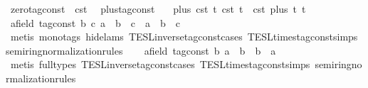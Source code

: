 \begin{isabellebody}
\isanewline
{}\isamarkupfalse%
\ {\isacartoucheopen}zero{\isacharunderscore}tag{\isacharunderscore}const\ {\isasymequiv}\ {\isasymtau}\isactrlsub c\isactrlsub s\isactrlsub t\ {}{\isacartoucheclose}\isanewline
\isanewline
{}\isamarkupfalse%
\ plus{\isacharunderscore}tag{\isacharunderscore}const\isanewline
\ \ \ {\isacartoucheopen}plus\ {\isacharparenleft}{\isasymtau}\isactrlsub c\isactrlsub s\isactrlsub t\ t\ {\isacharparenleft}{\isasymtau}\isactrlsub c\isactrlsub s\isactrlsub t\ t\ {\isacharequal}\ {\isasymtau}\isactrlsub c\isactrlsub s\isactrlsub t\ {\isacharparenleft}plus\ t\ t\isanewline
\isanewline
{}\isamarkupfalse%
%
\isadelimproof
\ %
\endisadelimproof
%
\isatagproof
{}\isamarkupfalse%
\isanewline
\ \ \isamarkupfalse%
\ {\isacartoucheopen}{\isasymAnd}{\isacharparenleft}a{\isacharcolon}{\isacharcolon}{\isacharparenleft}{\isacharprime}{\isasymtau}{\isacharcolon}{\isacharcolon}field\ tag{\isacharunderscore}const{\isacharparenright}{\isacharparenright}\ b\ c{\isachardot}\ a\ {\isacharasterisk}\ b\ {\isacharasterisk}\ c\ {\isacharequal}\ a\ {\isacharasterisk}\ {\isacharparenleft}b\ {\isacharasterisk}\ c{\isacharparenright}{\isacartoucheclose}\ \isanewline
\ \ \ \ \isamarkupfalse%
\ {\isacharparenleft}metis\ {\isacharparenleft}mono{\isacharunderscore}tags{\isacharcomma}\ hide{\isacharunderscore}lams{\isacharparenright}\ TESL{\isachardot}inverse{\isacharunderscore}tag{\isacharunderscore}const{\isachardot}cases\ TESL{\isachardot}times{\isacharunderscore}tag{\isacharunderscore}const{\isachardot}simps\ semiring{\isacharunderscore}normalization{\isacharunderscore}rules{\isacharparenleft}{}{}{\isacharparenright}{\isacharparenright}\isanewline
\ \ \isamarkupfalse%
\ {\isacartoucheopen}{\isasymAnd}{\isacharparenleft}a{\isacharcolon}{\isacharcolon}{\isacharparenleft}{\isacharprime}{\isasymtau}{\isacharcolon}{\isacharcolon}field\ tag{\isacharunderscore}const{\isacharparenright}{\isacharparenright}\ b{\isachardot}\ a\ {\isacharasterisk}\ b\ {\isacharequal}\ b\ {\isacharasterisk}\ a{\isacartoucheclose}\isanewline
\ \ \ \ \isamarkupfalse%
\ {\isacharparenleft}metis\ {\isacharparenleft}full{\isacharunderscore}types{\isacharparenright}\ TESL{\isachardot}inverse{\isacharunderscore}tag{\isacharunderscore}const{\isachardot}cases\ TESL{\isachardot}times{\isacharunderscore}tag{\isacharunderscore}const{\isachardot}simps\ semiring{\isacharunderscore}normalization{\isacharunderscore}rules{\isacharparenleft}{}{\isacharparenright}{\isacharparenright}\isanewline

\end{isabellebody}
